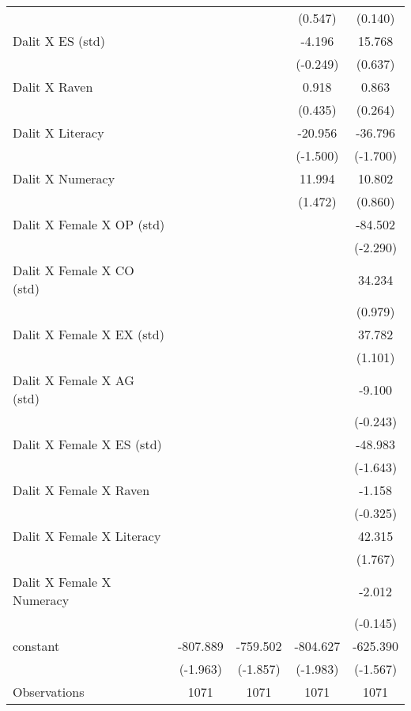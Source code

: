 \begin{table}[htbp]
{\begin{tabular}{lcccc}
          &       &       & (0.547) & (0.140) \\
    Dalit X ES (std) &       &       & -4.196 & 15.768 \\
          &       &       & (-0.249) & (0.637) \\
    Dalit X Raven &       &       & 0.918 & 0.863 \\
          &       &       & (0.435) & (0.264) \\
    Dalit X Literacy &       &       & -20.956 & -36.796 \\
          &       &       & (-1.500) & (-1.700) \\
    Dalit X Numeracy &       &       & 11.994 & 10.802 \\
          &       &       & (1.472) & (0.860) \\
    Dalit X Female X OP (std) &       &       &       & -84.502 \\
          &       &       &       & (-2.290) \\
    Dalit X Female X CO (std) &       &       &       & 34.234 \\
          &       &       &       & (0.979) \\
    Dalit X Female X EX (std) &       &       &       & 37.782 \\
          &       &       &       & (1.101) \\
    Dalit X Female X AG (std) &       &       &       & -9.100 \\
          &       &       &       & (-0.243) \\
    Dalit X Female X ES (std) &       &       &       & -48.983 \\
          &       &       &       & (-1.643) \\
    Dalit X Female X Raven &       &       &       & -1.158 \\
          &       &       &       & (-0.325) \\
    Dalit X Female X Literacy &       &       &       & 42.315 \\
          &       &       &       & (1.767) \\
    Dalit X Female X Numeracy &       &       &       & -2.012 \\
          &       &       &       & (-0.145) \\
    constant & -807.889 & -759.502 & -804.627 & -625.390 \\
          & (-1.963) & (-1.857) & (-1.983) & (-1.567) \\
    \midrule
    Observations & 1071  & 1071  & 1071  & 1071 \\

\end{tabular}}
\end{table}
